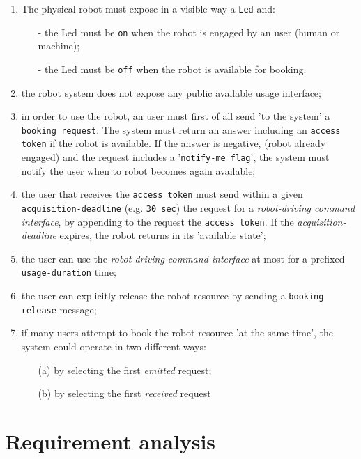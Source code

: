 \documentclass{../llncs}
\newcommand{\code}[1]{{\color{blue}\small{\texttt{#1}}}}
\newcommand{\labelsec}[1]{\label{sec:#1}}
\begin{document}
\begin{enumerate}
\item The physical robot must expose in a visible way a \code{Led} and:
\begin{itemize}
\item[-] the Led must be \code{on} when the robot is engaged by an user (human or machine);
\item[-] the Led must be \code{off} when the robot is available for booking.
\end{itemize}
\item the robot system does not expose any public available usage interface;
\item in order to use the robot, an user must first of all send 'to the system' a \code{booking request}. The system
must return an answer including an \code{access token} if the robot is available. If the answer is negative, (robot
already engaged) and the request includes a '\texttt{notify-me flag}', the system must notify the user when to robot
becomes again available;
\item the user that receives the \code{access token} must send within a given \code{acquisition-deadline} (e.g. \code{30 sec}) the request for a \emph{robot-driving command interface}, by appending to the request the \code{access token}. If the
\emph{acquisition-deadline} expires, the robot returns in its 'available state';
\item the user can use the \emph{robot-driving command interface} at most for a prefixed \code{usage-duration} time;
\item the user can explicitly release the robot resource by sending a \code{booking release} message;
\item if many users attempt to book the robot resource 'at the same time', the system could operate in two different
ways:
\begin{itemize}
\item[(a)] by selecting the first \emph{emitted} request;
\item[(b)] by selecting the first \emph{received} request
\end{itemize}
\end{enumerate}

\section{Requirement analysis}
\labelsec{ReqAnalysis}

\end{document}

